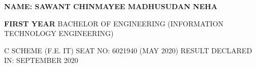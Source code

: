 \documentclass{article} %
\begin{document}
\noindent 

\noindent 

\noindent 

\noindent 

\noindent 

\noindent 

\noindent \textbf{\underbar{}}

\noindent \textbf{}

\noindent 

\noindent \textbf{NAME: SAWANT CHINMAYEE MADHUSUDAN NEHA}

\noindent 

\noindent \textbf{FIRST YEAR} BACHELOR OF ENGINEERING (INFORMATION TECHNOLOGY ENGINEERING)

\noindent \textbf{\underbar{}}

\noindent \textbf{} C SCHEME (F.E. IT)          SEAT NO: 6021940 (MAY 2020)         RESULT DECLARED IN: SEPTEMBER 2020

\noindent 

\noindent 
\end{document}
